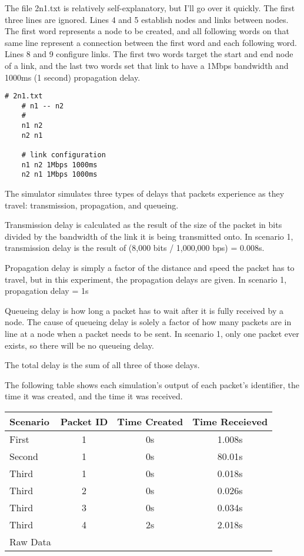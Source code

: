 \documentclass[11pt]{article}
\begin{document}
The file 2n1.txt is relatively self-explanatory, but I'll go over it quickly. The first three lines are ignored. Lines 4 and 5 establish nodes and links between nodes. The first word represents a node to be created, and all following words on that same line represent a connection between the first word and each following word. Lines 8 and 9 configure links. The first two words target the start and end node of a link, and the last two words set that link to have a 1Mbps bandwidth and 1000ms (1 second) propagation delay.

\begin{lstlisting}
# 2n1.txt
    # n1 -- n2
    #
    n1 n2
    n2 n1

    # link configuration
    n1 n2 1Mbps 1000ms
    n2 n1 1Mbps 1000ms
\end{lstlisting}

The simulator simulates three types of delays that packets experience as they travel: transmission, propagation, and queueing. 

Transmission delay is calculated as the result of the size of the packet in bits divided by the bandwidth of the link it is being transmitted onto. In scenario 1, transmission delay is the result of (8,000 bits / 1,000,000 bps) = 0.008s.

Propagation delay is simply a factor of the distance and speed the packet has to travel, but in this experiment, the propagation delays are given. In scenario 1, propagation delay = 1s

Queueing delay is how long a packet has to wait after it is fully received by a node. The cause of queueing delay is solely a factor of how many packets are in line at a node when a packet needs to be sent. In scenario 1, only one packet ever exists, so there will be no queueing delay.

The total delay is the sum of all three of those delays.

The following table shows each simulation's output of each packet's identifier, the time it was created, and the time it was received.

\vspace{0.5cm}
\begin{tabular}{lccc}
  \toprule
  Scenario & Packet ID & Time Created & Time Receieved\\
  \midrule
  First & 1 & 0s & 1.008s \\
  Second & 1 & 0s & 80.01s \\
  Third & 1 & 0s & 0.018s \\
  Third & 2 & 0s & 0.026s \\
  Third & 3 & 0s & 0.034s \\
  Third & 4 & 2s & 2.018s \\
  \bottomrule
  Raw Data
\end{tabular}
\vspace{0.5cm}
\end{document}
